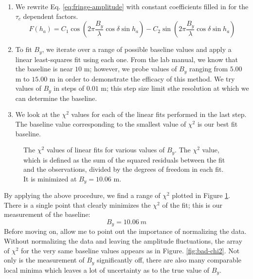 \documentclass[12pt]{article}
\begin{document}
\begin{enumerate}
  \item We rewrite Eq. \ref{eq:fringe-amplitude} with constant coefficients filled in for the $\tau_c$ dependent factors. 
  \begin{equation}
F(h_a) = C_1 \cos{\left( 2\pi \frac{B_y}{\lambda} 
\cos{\delta} \sin{h_a} \right)} - C_2 \sin{\left( 2\pi \frac{B_y}{\lambda} 
\cos{\delta} \sin{h_a} \right)} \label{eq:fringe-amplitude}
\end{equation}

  \item To fit $B_y$, we iterate over a range of possible baseline values and apply a linear least-squares fit using each one. From the lab manual, we know that the baseline is near $10$ m; however, we probe values of $B_y$ ranging from $5.00$ m to $15.00$ m in order to demonstrate the efficacy of this method. We try values of $B_y$ in steps of $0.01$ m; this step size limit sthe resolution at which we can determine the baseline.
   \item We look at the $\chi^2$ values for each of the linear fits performed in the last step. The baseline value corresponding to the smallest value of $\chi^2$ is our best fit baseline.
\end{enumerate}

\begin{figure}[H]
\caption[SODUMB]{The $\chi^2$ values of linear fits for various values of $B_y$. The $\chi^2$ value, which is defined as the sum of the squared residuals between the fit and the observations, divided by the degrees of freedom in each fit. It is minimized at $B_y=10.06$ m.}
\label{fig:baseline-chi2}
\end{figure}

By applying the above procedure, we find a range of $\chi^2$ plotted in Figure \ref{fig:baseline-chi2}. There is a single point that clearly minimizes the $\chi^2$ of the fit; this is our measurement of the baseline:
\begin{equation}
B_y = 10.06\ m 
\end{equation}
Before moving on, allow me to point out the importance of normalizing the data. Without normalizing the data and leaving the amplitude fluctuations, the array of $\chi^2$ for the very same baseline values appears as in Figure. \ref{fig:bad-chi2}. Not only is the measurement of $B_y$ significantly off, there are also many comparable local minima which leaves a lot of uncertainty as to the true value of $B_y$.
\end{document}
